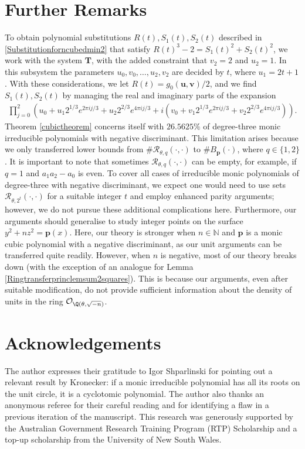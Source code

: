 \documentclass[12pt]{amsart}
\newcommand{\1}{\mathmybb{1}}
\begin{document}
\section{Further Remarks}
\label{Remarkcubicpolys}
To obtain polynomial substitutions $R(t),S_{1}(t),S_{2}(t)$ described in \eqref{Substitutionforncubedmin2} that satisfy $R(t)^3-2 = S_{1}(t)^2 +S_{2}(t)^2$, we work with the system $\mathbf{T}$, with the added constraint that $v_{2} = 2$ and $u_{2} = 1$. In this subsystem the parameters $u_{0},v_{0},\ldots,u_{2},v_{2}$ are decided by $t$, where $u_{1} = 2t+1$. With these considerations, we let $R(t) = g_{0}(\mathbf{u},\mathbf{v})/2$, and we find $S_{1}(t), S_{2}(t)$ by managing the real and imaginary parts of the expansion
\begin{align*}
\prod_{j=0}^{2}\left(u_{0}+u_{1}2^{1/3}e^{2\pi i j/ 3}+u_{2}2^{2/3}e^{4 \pi i j/ 3} + i(v_{0}+v_{1}2^{1/3}e^{2\pi i j/ 3}+v_{2}2^{2/3}e^{4 \pi i j/ 3})\right).
\end{align*}
Theorem \ref{cubictheorem} concerns itself with $26.5625\%$ of degree-three monic irreducible polynomials with negative discriminant. This limitation arises because we only transferred lower bounds from $\#\mathcal{R}_{\theta,q}(\cdot,\cdot)$  to $\#B_{\mathbf{p}}(\cdot)$, where $q \in\{1,2\}$. It is important to note that sometimes $\mathcal{R}_{\theta,q}(\cdot,\cdot)$ can be empty, for example, if $q = 1$ and $a_{1}a_{2}-a_{0}$ is even. To cover all cases of irreducible monic polynomials of degree-three with negative discriminant, we expect one would need to use sets $\mathcal{R}_{\theta,2^{t}}(\cdot,\cdot)$ for a suitable integer $t$ and employ enhanced parity arguments; however, we do not pursue these additional complications here. Furthermore, our arguments should generalise to study integer points on the surface $y^2+n z^2 = \mathbf{p}(x)$. Here, our theory is stronger when $n \in \mathbb{N}$ and $\mathbf{p}$ is a monic cubic polynomial with a negative discriminant, as our unit arguments can be transferred quite readily. However, when $n$ is negative, most of our theory breaks down (with the exception of an analogue for Lemma \ref{Ringtransferprinclemsum2squares}). This is because our arguments, even after suitable modification, do not provide sufficient information about the density of units in the ring $\mathcal{O}_{\Q(\theta,\sqrt{-n})}$.
\section{Acknowledgements}
The author expresses their gratitude to Igor Shparlinski for pointing out a relevant result by Kronecker: if a monic irreducible polynomial has all its roots on the unit circle, it is a cyclotomic polynomial. The author also thanks an anonymous referee for their careful reading and for identifying a flaw in a previous iteration of the manuscript. This research was generously supported by the Australian Government Research Training Program (RTP) Scholarship and a top-up scholarship from the University of New South Wales.
\end{document}
